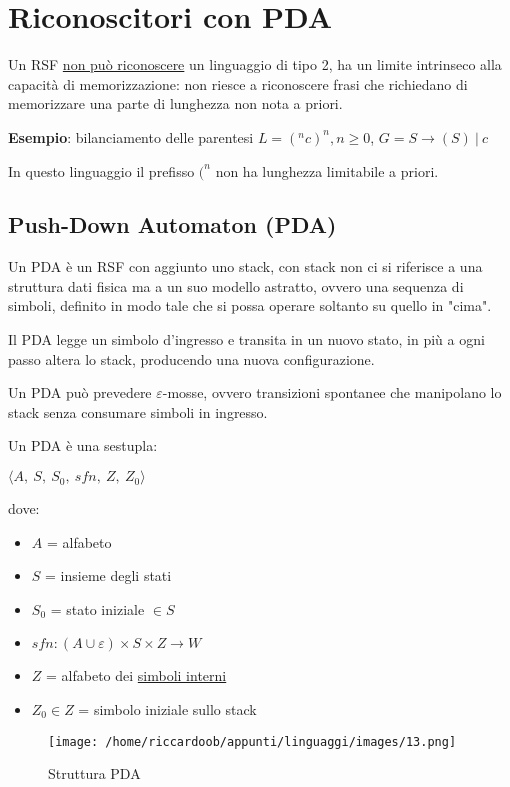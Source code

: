 \chapter{Riconoscitori con PDA}

Un RSF \underline{non può riconoscere} un linguaggio di tipo 2, ha un limite intrinseco alla capacità di memorizzazione: non riesce a riconoscere frasi che richiedano di memorizzare una parte di lunghezza non nota a priori.

\textbf{Esempio}: bilanciamento delle parentesi $L = {(^n c )^n, n \ge 0}$, $G = {S \rightarrow (S)\ |\ c}$

In questo linguaggio il prefisso $(^n$ non ha lunghezza limitabile a priori.

\section{Push-Down Automaton (PDA)}
Un PDA è un RSF con aggiunto uno stack, con stack non ci si riferisce a una struttura dati fisica ma a un suo modello astratto, ovvero una sequenza di simboli, definito in modo tale che si possa operare soltanto su quello in "cima".

Il PDA legge un simbolo d'ingresso e transita in un nuovo stato, in più a ogni passo altera lo stack, producendo una nuova configurazione.

Un PDA può prevedere $\varepsilon$-mosse, ovvero transizioni spontanee che manipolano lo stack senza consumare simboli in ingresso.

Un PDA è una sestupla:

{\centering
$\langle A,\ S,\ S_0,\ sfn,\ Z,\ Z_0\rangle$\par}
dove:
\begin{itemize}
    \item $A$ = alfabeto
    \item $S$ = insieme degli stati
    \item $S_0$ = stato iniziale $\in S$
    \item $sfn: (A\cup \varepsilon) \times S \times Z \rightarrow W$
    \item $Z$ = alfabeto dei \underline{simboli interni} 
    \item $Z_0 \in Z$ = simbolo iniziale sullo stack
\end{itemize}
\setlist{}

\begin{figure}[H]
    \caption{Struttura PDA}
    \centering
    \texttt{[image: /home/riccardoob/appunti/linguaggi/images/13.png]}
\end{figure}

